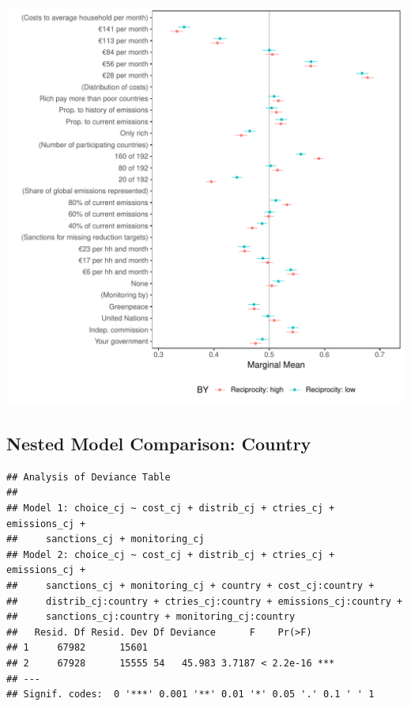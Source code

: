 \documentclass[a4paper,12pt]{article}\usepackage[]{graphicx}\usepackage[]{color}
\makeatletter
\def\maxwidth{ %
  \ifdim\Gin@nat@width>\linewidth
    \linewidth
  \else
    \Gin@nat@width
  \fi
}
\newenvironment{kframe}{%
 \def\at@end@of@kframe{}%
 \ifinner\ifhmode%
  \def\at@end@of@kframe{\end{minipage}}%
  \begin{minipage}{\columnwidth}%
 \fi\fi%
 \def\FrameCommand##1{\hskip\@totalleftmargin \hskip-\fboxsep
 \colorbox{shadecolor}{##1}\hskip-\fboxsep
     \hskip-\linewidth \hskip-\@totalleftmargin \hskip\columnwidth}%
 \MakeFramed {\advance\hsize-\width
   \@totalleftmargin\z@ \linewidth\hsize
   \@setminipage}}%
 {\par\unskip\endMakeFramed%
 \at@end@of@kframe}
\newenvironment{knitrout}{}{} %
\makeatother
\begin{document}
\begin{knitrout}
\color{fgcolor}
\includegraphics[width=\maxwidth]{figure/bechtel_subgroup_mm_reciprocity-1} 

\end{knitrout}

\clearpage

\clearpage

\subsection{Nested Model Comparison: Country}

\begin{knitrout}
\color{fgcolor}\begin{kframe}
\begin{verbatim}
## Analysis of Deviance Table
## 
## Model 1: choice_cj ~ cost_cj + distrib_cj + ctries_cj + emissions_cj + 
##     sanctions_cj + monitoring_cj
## Model 2: choice_cj ~ cost_cj + distrib_cj + ctries_cj + emissions_cj + 
##     sanctions_cj + monitoring_cj + country + cost_cj:country + 
##     distrib_cj:country + ctries_cj:country + emissions_cj:country + 
##     sanctions_cj:country + monitoring_cj:country
##   Resid. Df Resid. Dev Df Deviance      F    Pr(>F)    
## 1     67982      15601                                 
## 2     67928      15555 54   45.983 3.7187 < 2.2e-16 ***
## ---
## Signif. codes:  0 '***' 0.001 '**' 0.01 '*' 0.05 '.' 0.1 ' ' 1
\end{verbatim}
\end{kframe}
\end{knitrout}
\end{document}
